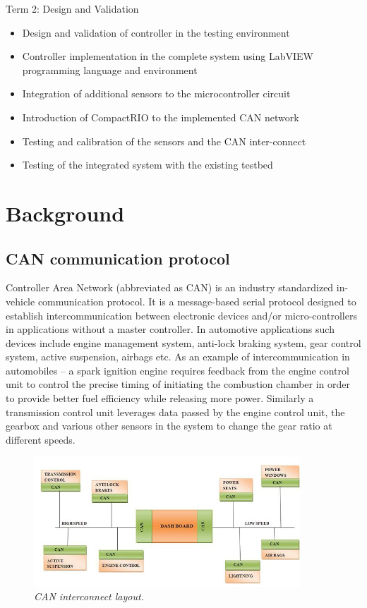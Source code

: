 \documentclass{article}
\begin{document}
\begin{flushleft}
Term 2: Design and Validation
\begin{itemize}
  \item Design and validation of controller in the testing environment
  \item Controller implementation in the complete system using LabVIEW programming language and environment
  \item Integration of additional sensors to the microcontroller circuit
  \item Introduction of CompactRIO to the implemented CAN network
  \item Testing and calibration of the sensors and the CAN inter-connect
  \item Testing of the integrated system with the existing testbed
\end{itemize}
\end{flushleft}

\section{Background}
\subsection{CAN communication protocol}
\begin{flushleft}
Controller Area Network (abbreviated as CAN) is an industry standardized in-vehicle communication protocol. It is a message-based serial protocol designed to establish intercommunication between electronic devices and/or micro-controllers in applications without a master controller. In automotive applications such devices include engine management system, anti-lock braking system, gear control system, active suspension, airbags etc. As an example of intercommunication in automobiles – a spark ignition engine requires feedback from the engine control unit to control the precise timing of initiating the combustion chamber in order to provide better fuel efficiency while releasing more power. Similarly a transmission control unit leverages data passed by the engine control unit, the gearbox and various other sensors in the system to change the gear ratio at different speeds.
\end{flushleft}

\begin{figure}[!ht]
\centering 
\includegraphics[width=10cm]{fig_2.png}
\caption{\small \sl CAN interconnect layout.}  
\end{figure}
\end{document}
